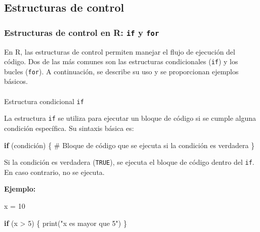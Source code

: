 \documentclass[
  spanish,
  letterpaper,
  DIV=11,
  numbers=noendperiod]{scrreprt}
\makeatletter
\let\oldparagraph\paragraph
\renewcommand{\paragraph}{
    \@ifstar
      \xxxParagraphStar
      \xxxParagraphNoStar
  }
\newcommand{\xxxParagraphStar}[1]{\oldparagraph*{#1}\mbox{}}
\newcommand{\xxxParagraphNoStar}[1]{\oldparagraph{#1}\mbox{}}
\newenvironment{Shaded}{\begin{snugshade}}{\end{snugshade}}
\newcommand{\CommentTok}[1]{\textcolor[rgb]{0.37,0.37,0.37}{#1}}
\newcommand{\ControlFlowTok}[1]{\textcolor[rgb]{0.00,0.23,0.31}{\textbf{#1}}}
\newcommand{\DecValTok}[1]{\textcolor[rgb]{0.68,0.00,0.00}{#1}}
\newcommand{\FunctionTok}[1]{\textcolor[rgb]{0.28,0.35,0.67}{#1}}
\newcommand{\NormalTok}[1]{\textcolor[rgb]{0.00,0.23,0.31}{#1}}
\newcommand{\OtherTok}[1]{\textcolor[rgb]{0.00,0.23,0.31}{#1}}
\newcommand{\SpecialCharTok}[1]{\textcolor[rgb]{0.37,0.37,0.37}{#1}}
\newcommand{\StringTok}[1]{\textcolor[rgb]{0.13,0.47,0.30}{#1}}
\makeatother
\begin{document}
\subsection{Estructuras de control}\label{estructuras-de-control}

\subsubsection{\texorpdfstring{Estructuras de control en R: \texttt{if}
y
\texttt{for}}{Estructuras de control en R: if y for}}\label{estructuras-de-control-en-r-if-y-for}

En R, las estructuras de control permiten manejar el flujo de ejecución
del código. Dos de las más comunes son las estructuras condicionales
(\texttt{if}) y los bucles (\texttt{for}). A continuación, se describe
su uso y se proporcionan ejemplos básicos.

\paragraph{\texorpdfstring{Estructura condicional
\texttt{if}}{Estructura condicional if}}\label{estructura-condicional-if}

La estructura \texttt{if} se utiliza para ejecutar un bloque de código
si se cumple alguna condición específica. Su sintaxis básica es:

\begin{Shaded}
\begin{Highlighting}[]
\ControlFlowTok{if}\NormalTok{ (condición) \{}
  \CommentTok{\# Bloque de código que se ejecuta si la condición es verdadera}
\NormalTok{\}}
\end{Highlighting}
\end{Shaded}

Si la condición es verdadera (\texttt{TRUE}), se ejecuta el bloque de
código dentro del \texttt{if}. En caso contrario, no se ejecuta.

\textbf{Ejemplo:}

\begin{Shaded}
\begin{Highlighting}[]
\NormalTok{x }\OtherTok{=} \DecValTok{10}

\ControlFlowTok{if}\NormalTok{ (x }\SpecialCharTok{\textgreater{}} \DecValTok{5}\NormalTok{) \{}
  \FunctionTok{print}\NormalTok{(}\StringTok{"x es mayor que 5"}\NormalTok{)}
\NormalTok{\}}
\end{Highlighting}
\end{Shaded}
\end{document}
